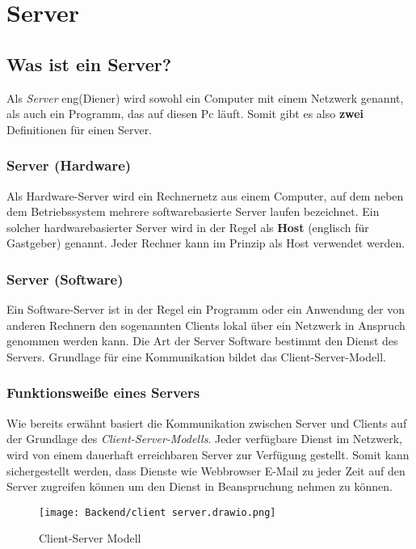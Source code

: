 \section{Server}
\label{server}

\subsection{Was ist ein Server?}
Als \textit{Server} eng(Diener) wird sowohl ein Computer mit einem Netzwerk genannt,
als auch ein Programm, das auf diesen Pc läuft. Somit gibt es also \textbf{zwei} Definitionen
für einen Server.

\subsubsection{Server (Hardware)}
Als Hardware-Server wird ein Rechnernetz aus einem Computer, auf dem neben dem Betriebssystem
mehrere softwarebasierte Server laufen bezeichnet. Ein solcher hardwarebasierter
Server wird in der Regel als \textbf{Host} (englisch für Gastgeber) genannt. Jeder Rechner kann
im Prinzip als Host verwendet
werden.

\subsubsection{Server (Software)}
Ein Software-Server ist in der Regel ein Programm oder ein Anwendung
der von anderen Rechnern den sogenannten Clients lokal über ein Netzwerk in Anspruch genommen
werden kann. Die Art der Server Software bestimmt den Dienst des Servers. Grundlage für
eine Kommunikation bildet das Client-Server-Modell. \underline{}

\subsubsection{Funktionsweiße eines Servers}
Wie bereits erwähnt basiert die Kommunikation zwischen Server und Clients
auf der Grundlage des \textit{Client-Server-Modells}. Jeder verfügbare Dienst im Netzwerk, wird von
einem dauerhaft erreichbaren Server zur Verfügung gestellt. Somit kann sichergestellt werden, dass
Dienste wie Webbrowser E-Mail zu jeder Zeit auf den Server zugreifen können um den Dienst
in Beanspruchung nehmen zu können.

\begin{figure}[H]
    \centering
    \texttt{[image: Backend/client server.drawio.png]}
    \caption{Client-Server Modell}
\end{figure}
